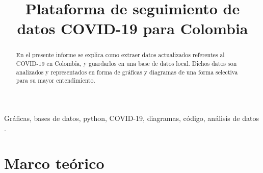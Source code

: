 \documentclass[conference,compsoc,onecolumn]{IEEEtran}
\begin{document}
\title{Plataforma de seguimiento de datos COVID-19 para Colombia}



\author{
\and
{}
}
\maketitle
\IEEEoverridecommandlockouts
\IEEEpeerreviewmaketitle

\begin{abstract}
En el presente informe se explica como extraer datos actualizados referentes al COVID-19 en Colombia, y guardarlos en una base de datos local. Dichos datos son analizados y representados en forma de gráficas y diagramas de una forma selectiva para su mayor entendimiento.
\end{abstract}


\begin{IEEEkeywords}
 Gráficas, bases de datos, python, COVID-19, diagramas, código, análisis de datos .
\end{IEEEkeywords}


\section{Marco teórico}
\label{sec:introduction}
\end{document}
